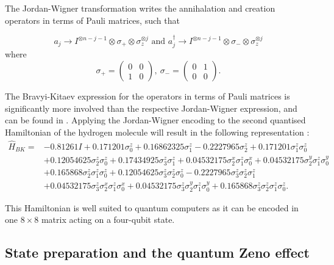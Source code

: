 The Jordan-Wigner transformation writes the annihalation and creation operators in terms of Pauli matrices, such that \cite{daskin}

$$
a_{j} \rightarrow I^{\otimes n-j-1} \otimes \sigma_{+} \otimes \sigma_{z}^{\otimes j} \text {  and  } a_{j}^{\dagger} \rightarrow I^{\otimes n-j-1} \otimes \sigma_{-} \otimes \sigma_{z}^{\otimes j}
$$
where
$$
\sigma_+ = \begin{pmatrix} 0&0\\1&0 \end{pmatrix}, \
\sigma_- = \begin{pmatrix} 0&1\\0&0 \end{pmatrix}.
$$


The Bravyi-Kitaev expression for the operators in terms of Pauli matrices is significantly more involved than the respective Jordan-Wigner expression, and can be found in \cite{seeley}. Applying the Jordan-Wigner encoding to the second quantised Hamiltonian of the hydrogen molecule will result in the following representation \cite{seeley}:
\begin{equation} \label{ham}
\begin{aligned}
\hat{H}_{B K}=&-0.81261 I+0.171201 \sigma_{0}^{z}+0.16862325 \sigma_{1}^{z}-0.2227965 \sigma_{2}^{z}+0.171201 \sigma_{1}^{z} \sigma_{0}^{z} \\
&+0.12054625 \sigma_{2}^{z} \sigma_{0}^{z}+0.17434925 \sigma_{3}^{z} \sigma_{1}^{z}+0.04532175 \sigma_{2}^{x} \sigma_{1}^{z} \sigma_{0}^{x}+0.04532175 \sigma_{2}^{y} \sigma_{1}^{z} \sigma_{0}^{y} \\
&+0.165868 \sigma_{2}^{z} \sigma_{1}^{z} \sigma_{0}^{z}+0.12054625 \sigma_{3}^{z} \sigma_{2}^{z} \sigma_{0}^{z}-0.2227965 \sigma_{3}^{z} \sigma_{2}^{z} \sigma_{1}^{z} \\
&+0.04532175 \sigma_{3}^{z} \sigma_{2}^{x} \sigma_{1}^{z} \sigma_{0}^{x}+0.04532175 \sigma_{3}^{z} \sigma_{2}^{y} \sigma_{1}^{z} \sigma_{0}^{y}+0.165868 \sigma_{3}^{z} \sigma_{2}^{z} \sigma_{1}^{z} \sigma_{0}^{z}.
\end{aligned}
\end{equation}

This Hamiltonian is well suited to quantum computers as it can be encoded in one $8 \times 8$ matrix acting on a four-qubit state.

\subsection{State preparation and the quantum Zeno effect}
\label{subsec: zeno}

